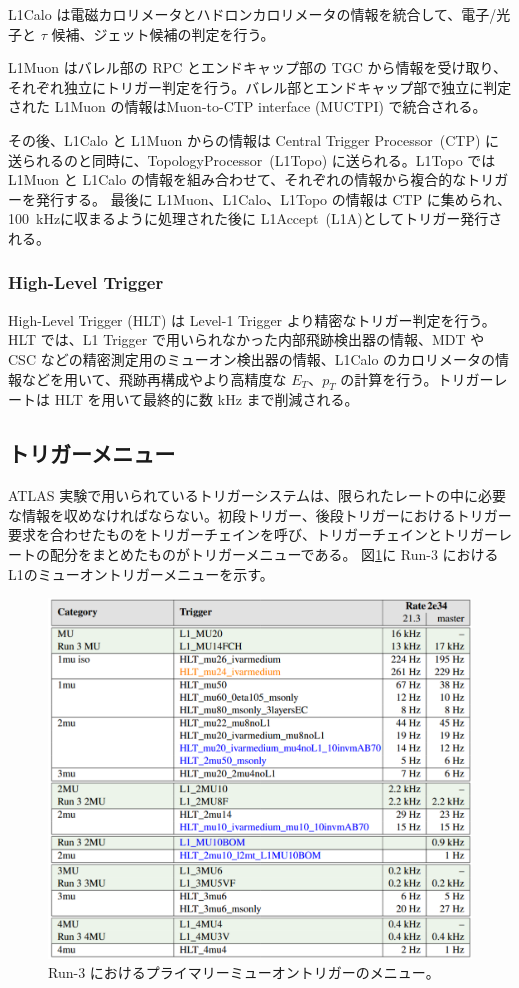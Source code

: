 L1Calo は電磁カロリメータとハドロンカロリメータの情報を統合して、電子/光子と $\tau$ 候補、ジェット候補の判定を行う。

L1Muon はバレル部の RPC とエンドキャップ部の TGC から情報を受け取り、それぞれ独立にトリガー判定を行う。バレル部とエンドキャップ部で独立に判定された L1Muon の情報はMuon-to-CTP interface (MUCTPI) で統合される。

その後、L1Calo と L1Muon からの情報は Central Trigger Processor~(CTP) に送られるのと同時に、TopologyProcessor~(L1Topo) に送られる。L1Topo では L1Muon と L1Calo の情報を組み合わせて、それぞれの情報から複合的なトリガーを発行する。
最後に L1Muon、L1Calo、L1Topo の情報は CTP に集められ、100~kHzに収まるように処理された後に L1Accept~(L1A)としてトリガー発行される。

\subsubsection{High-Level Trigger}
High-Level Trigger (HLT) は Level-1 Trigger より精密なトリガー判定を行う。
HLT では、L1 Trigger で用いられなかった内部飛跡検出器の情報、MDT や CSC などの精密測定用のミューオン検出器の情報、L1Calo のカロリメータの情報などを用いて、飛跡再構成やより高精度な $E_T$、$p_T$ の計算を行う。トリガーレートは HLT を用いて最終的に数 kHz まで削減される。

\subsection{トリガーメニュー}
ATLAS 実験で用いられているトリガーシステムは、限られたレートの中に必要な情報を収めなければならない。初段トリガー、後段トリガーにおけるトリガー要求を合わせたものをトリガーチェインを呼び、トリガーチェインとトリガーレートの配分をまとめたものがトリガーメニューである。
図\ref{fig:muon_trigger_menu.pdf}に Run-3 におけるL1のミューオントリガーメニューを示す。
\begin{figure}[b]
  \centering
  \includegraphics[clip, width=14cm]{fig/2/muon_trigger_menu.pdf}
  \caption{Run-3 におけるプライマリーミューオントリガーのメニュー\cite{article:Run3trigmenu}。}
  \label{fig:muon_trigger_menu.pdf}
\end{figure}

